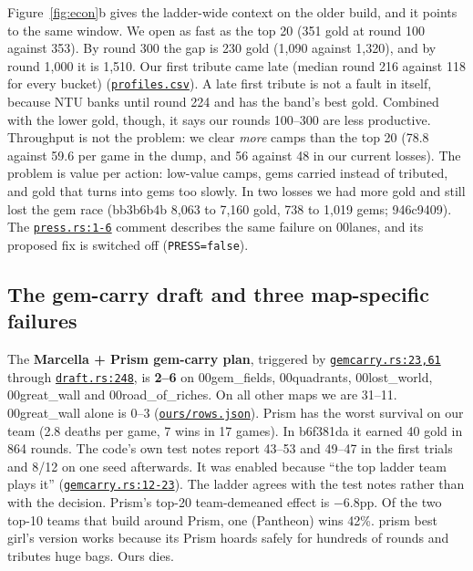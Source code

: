 \documentclass[11pt,a4paper]{article}
\newcommand{\scratch}{file:///private/tmp/claude-501/-Users-tristanbasri-Desktop-Code-cambridge-battlecode-s2/b3f4cb6b-e46a-405f-957c-42c44c05c8dc/scratchpad/ladder-data}
\newcommand{\repo}{file:///Users/tristanbasri/Desktop/Code/cambridge-battlecode-s2}
\newcommand{\src}[2]{{\small(\href{#1}{\textcolor{cTop}{\texttt{#2}}})}}
\newcommand{\code}[2]{\href{\repo/#1}{\texttt{\textcolor{cOurs!80!black}{#2}}}}
\newcommand{\vfive}{bots/bot-v5-r175199/src}
\begin{document}
Figure~\ref{fig:econ}b gives the ladder-wide context on the older build, and it points to the same window. We open as fast as the top 20 (351 gold at round 100 against 353). By round 300 the gap is 230 gold (1,090 against 1,320), and by round 1,000 it is 1,510. Our first tribute came late (median round 216 against 118 for every bucket) \src{\scratch/matchdb/out/profiles.csv}{profiles.csv}. A late first tribute is not a fault in itself, because NTU banks until round 224 and has the band's best gold. Combined with the lower gold, though, it says our rounds 100--300 are less productive. Throughput is not the problem: we clear \emph{more} camps than the top 20 (78.8 against 59.6 per game in the dump, and 56 against 48 in our current losses). The problem is value per action: low-value camps, gems carried instead of tributed, and gold that turns into gems too slowly. In two losses we had more gold and still lost the gem race (bb3b6b4b 8,063 to 7,160 gold, 738 to 1,019 gems; 946c9409). The \code{bots/bot-v5/src/common/press.rs}{press.rs:1-6} comment describes the same failure on 00lanes, and its proposed fix is switched off (\texttt{PRESS=false}).

\subsection{The gem-carry draft and three map-specific failures}

The \textbf{Marcella + Prism gem-carry plan}, triggered by \code{\vfive/common/gemcarry.rs}{gemcarry.rs:23,61} through \code{\vfive/draft.rs}{draft.rs:248}, is \textbf{2--6} on 00gem\_fields, 00quadrants, 00lost\_world, 00great\_wall and 00road\_of\_riches. On all other maps we are 31--11. 00great\_wall alone is 0--3 \src{\scratch/ours/rows.json}{ours/rows.json}. Prism has the worst survival on our team (2.8 deaths per game, 7 wins in 17 games). In b6f381da it earned 40 gold in 864 rounds. The code's own test notes report 43--53 and 49--47 in the first trials and 8/12 on one seed afterwards. It was enabled because ``the top ladder team plays it'' \src{\repo/\vfive/common/gemcarry.rs}{gemcarry.rs:12-23}. The ladder agrees with the test notes rather than with the decision. Prism's top-20 team-demeaned effect is $-$6.8pp. Of the two top-10 teams that build around Prism, one (Pantheon) wins 42\%. prism best girl's version works because its Prism hoards safely for hundreds of rounds and tributes huge bags. Ours dies.
\end{document}
